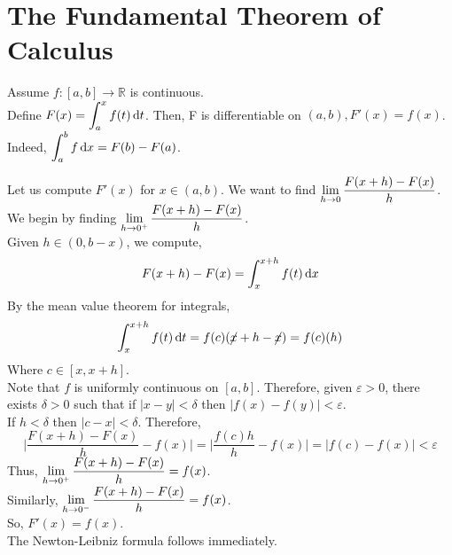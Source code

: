 \documentclass[12pt]{article}
\begin{document}
\section{The Fundamental Theorem of Calculus}
\begin{theo}{}
Assume \(f: [a, b]\to \mathbb R\) is continuous.\\
Define \(F(x) = \displaystyle\int_a^x f(t) \,\mathrm{d} t\). Then, F is differentiable on \((a, b), F'(x) = f(x)\).\\
Indeed, \(\displaystyle\int_a^b f \,\mathrm{d} x = F(b) - F(a)\).    
\end{theo}
\begin{prf}{}
Let us compute \(F'(x)\) for \(x\in(a, b)\). We want to find \(\displaystyle\lim_{h\to 0} \frac{F(x+h) - F(x)}{h}\).\\
We begin by finding \(\displaystyle\lim_{h\to 0^+} \frac{F(x+h) - F(x)}{h}\).\\
Given \(h\in (0, b-x)\), we compute, \[F(x+h) - F(x) = \displaystyle\int_x^{x+h}f(t)\,\mathrm{d} x\]
By the mean value theorem for integrals,
\[\displaystyle\int_x^{x+h} f(t) \,\mathrm{d} t = f(c)(\cancel{x}+ h - \cancel{x}) = f(c)(h)\]
Where \(c\in [x, x+h]\).\\
Note that \(f\) is uniformly continuous on \([a, b]\). Therefore, given \(\varepsilon > 0\), there exists \(\delta > 0\) such that if \(|x-y| < \delta\) then \(|f(x) - f(y)| < \varepsilon\).\\
If \(h < \delta\) then \(|c- x| < \delta\). Therefore, \[\bigg\vert\frac{F(x+h) - F(x)}{h} - f(x)\bigg\vert = \bigg\vert\frac{f(c)h}{h}-f(x)\bigg\vert = |f(c) - f(x)| < \varepsilon\]
Thus, \(\displaystyle\lim_{h\to 0^+} \frac{F(x+h) - F(x)}{h} = f(x)\).\\
Similarly, \(\displaystyle\lim_{h\to 0^-} \frac{F(x+h) - F(x)}{h} = f(x)\).\\
So, \(F'(x) = f(x)\).\\
The Newton-Leibniz formula follows immediately.
\end{prf}
\end{document}
